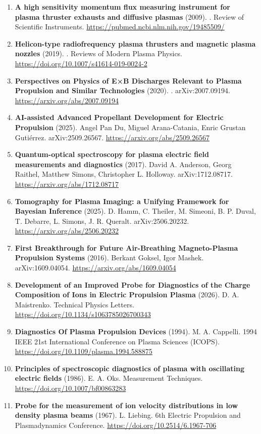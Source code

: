 \documentclass[11pt,a4paper]{article}
\begin{document}
\begin{enumerate}[leftmargin=1.4em]
\item \textbf{A high sensitivity momentum flux measuring instrument for plasma thruster exhausts and diffusive plasmas} (2009). . Review of Scientific Instruments. \url{https://pubmed.ncbi.nlm.nih.gov/19485509/}
\item \textbf{Helicon-type radiofrequency plasma thrusters and magnetic plasma nozzles} (2019). . Reviews of Modern Plasma Physics. \url{https://doi.org/10.1007/s41614-019-0024-2}
\item \textbf{Perspectives on Physics of E×B Discharges Relevant to Plasma Propulsion and Similar Technologies} (2020). . arXiv:2007.09194. \url{https://arxiv.org/abs/2007.09194}
\item \textbf{AI-assisted Advanced Propellant Development for Electric Propulsion} (2025). Angel Pan Du, Miguel Arana-Catania, Enric Grustan Gutiérrez. arXiv:2509.26567. \url{https://arxiv.org/abs/2509.26567}
\item \textbf{Quantum-optical spectroscopy for plasma electric field measurements and diagnostics} (2017). David A. Anderson, Georg Raithel, Matthew Simons, Christopher L. Holloway. arXiv:1712.08717. \url{https://arxiv.org/abs/1712.08717}
\item \textbf{Tomography for Plasma Imaging: a Unifying Framework for Bayesian Inference} (2025). D. Hamm, C. Theiler, M. Simeoni, B. P. Duval, T. Debarre, L. Simons, J. R. Queralt. arXiv:2506.20232. \url{https://arxiv.org/abs/2506.20232}
\item \textbf{First Breakthrough for Future Air-Breathing Magneto-Plasma Propulsion Systems} (2016). Berkant Goksel, Igor Mashek. arXiv:1609.04054. \url{https://arxiv.org/abs/1609.04054}
\item \textbf{Development of an Improved Probe for Diagnostics of the Charge Composition of Ions in Electric Propulsion Plasma} (2026). D. A. Maistrenko. Technical Physics Letters. \url{https://doi.org/10.1134/s1063785026700343}
\item \textbf{Diagnostics Of Plasma Propulsion Devices} (1994). M. A. Cappelli. 1994 IEEE 21st International Conference on Plasma Sciences (ICOPS). \url{https://doi.org/10.1109/plasma.1994.588875}
\item \textbf{Principles of spectroscopic diagnostics of plasma with oscillating electric fields} (1986). E. A. Oks. Measurement Techniques. \url{https://doi.org/10.1007/bf00863283}
\item \textbf{Probe for the measurement of ion velocity distributions in low density plasma beams} (1967). L. Liebing. 6th Electric Propulsion and Plasmadynamics Conference. \url{https://doi.org/10.2514/6.1967-706}

\end{enumerate}
\end{document}
